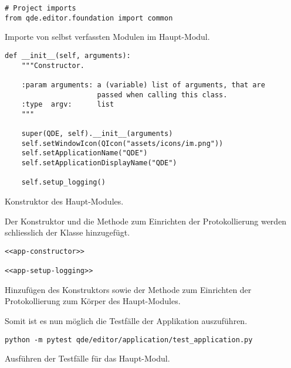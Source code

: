 \documentclass[10pt, openright, notitlepage]{scrreprt}
\begin{document}
\begin{listing}[H]
\begin{verbatim}
# Project imports
from qde.editor.foundation import common
\end{verbatim}
\caption{\label{org47e7c52}
Importe von selbst verfassten Modulen im Haupt-Modul.}
\end{listing}

\begin{listing}[H]
\begin{verbatim}
def __init__(self, arguments):
    """Constructor.

    :param arguments: a (variable) list of arguments, that are
                      passed when calling this class.
    :type  argv:      list
    """

    super(QDE, self).__init__(arguments)
    self.setWindowIcon(QIcon("assets/icons/im.png"))
    self.setApplicationName("QDE")
    self.setApplicationDisplayName("QDE")

    self.setup_logging()
\end{verbatim}
\caption{\label{org74f93fc}
Konstruktor des Haupt-Modules.}
\end{listing}

Der Konstruktor und die Methode zum Einrichten der Protokollierung werden
schliesslich der Klasse hinzugefügt.

\begin{listing}[H]
\begin{verbatim}
<<app-constructor>>

<<app-setup-logging>>
\end{verbatim}
\caption{\label{org017e569}
Hinzufügen des Konstruktors sowie der Methode zum Einrichten der Protokollierung zum Körper des Haupt-Modules.}
\end{listing}

Somit ist es nun möglich die Testfälle der Applikation auszuführen.

\begin{listing}[H]
\begin{verbatim}
python -m pytest qde/editor/application/test_application.py
\end{verbatim}
\caption{Ausführen der Testfälle für das Haupt-Modul.}
\end{listing}
\end{document}
